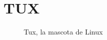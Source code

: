 \chapter{TUX}\label{cap:introduccion}


\begin{figure}[h]
  \centering
  	\def\svgwidth{0.5\textwidth}
  	 
	   \caption{Tux, la mascota de Linux} %
   \label{fig:tux}
\end{figure}